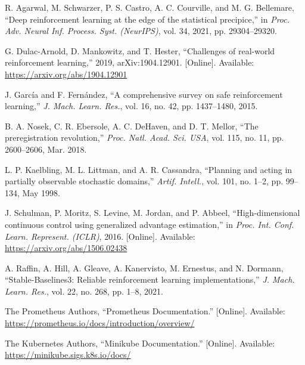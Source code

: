 \begin{enumerate}[label={[\arabic*]}, leftmargin=2.4em, itemsep=0.4em]
\item\label{agarwal2021precipice} R. Agarwal, M. Schwarzer, P. S. Castro, A. C. Courville, and M. G. Bellemare, ``Deep reinforcement learning at the edge of the statistical precipice,'' in \textit{Proc. Adv. Neural Inf. Process. Syst. (NeurIPS)}, vol. 34, 2021, pp. 29304--29320.

\item\label{dulacarnold2019challenges} G. Dulac-Arnold, D. Mankowitz, and T. Hester, ``Challenges of real-world reinforcement learning,'' 2019, arXiv:1904.12901. [Online]. Available: \url{https://arxiv.org/abs/1904.12901}

\item\label{garcia2015safe} J. Garc\'ia and F. Fern\'andez, ``A comprehensive survey on safe reinforcement learning,'' \textit{J. Mach. Learn. Res.}, vol. 16, no. 42, pp. 1437--1480, 2015.

\item\label{nosek2018preregistration} B. A. Nosek, C. R. Ebersole, A. C. DeHaven, and D. T. Mellor, ``The preregistration revolution,'' \textit{Proc. Natl. Acad. Sci. USA}, vol. 115, no. 11, pp. 2600--2606, Mar. 2018.

\item\label{kaelbling1998pomdp} L. P. Kaelbling, M. L. Littman, and A. R. Cassandra, ``Planning and acting in partially observable stochastic domains,'' \textit{Artif. Intell.}, vol. 101, no. 1--2, pp. 99--134, May 1998.

\item\label{schulman2016gae} J. Schulman, P. Moritz, S. Levine, M. Jordan, and P. Abbeel, ``High-dimensional continuous control using generalized advantage estimation,'' in \textit{Proc. Int. Conf. Learn. Represent. (ICLR)}, 2016. [Online]. Available: \url{https://arxiv.org/abs/1506.02438}

\item\label{raffin2021sb3} A. Raffin, A. Hill, A. Gleave, A. Kanervisto, M. Ernestus, and N. Dormann, ``Stable-Baselines3: Reliable reinforcement learning implementations,'' \textit{J. Mach. Learn. Res.}, vol. 22, no. 268, pp. 1--8, 2021.

\item\label{prometheus_docs} The Prometheus Authors, ``Prometheus Documentation.'' [Online]. Available: \url{https://prometheus.io/docs/introduction/overview/}

\item\label{minikube_docs} The Kubernetes Authors, ``Minikube Documentation.'' [Online]. Available: \url{https://minikube.sigs.k8s.io/docs/}

\end{enumerate}
\endgroup
